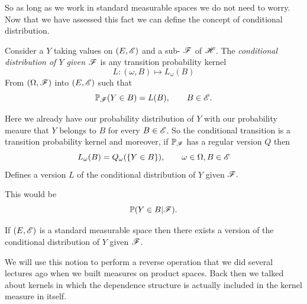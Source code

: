 \documentclass{report}
\begin{document}
So as long as we work in standard measurable spaces we do not need to worry. Now that we have assessed this fact we can define the concept of conditional distribution.
\begin{definition}
	Consider a \rv{} $Y$ taking values on $(E,\mathscr{E})$ and a sub-\sa{} $\mathscr{F}$ of $\mathscr{H}$. The \emph{conditional distribution of $Y$ given $\mathscr{F}$} is any transition probability kernel
	\begin{equation*}
		L:(\omega,B)\mapsto L_{\omega}(B)
	\end{equation*}
	From $(\Omega,\mathscr{F})$ into $(E,\mathscr{E})$ such that
	\begin{equation*}
		\mathbb{P}_{\mathscr{F}}(Y\in B)=L(B),\qquad B\in\mathscr{E}.
	\end{equation*}
 \end{definition}
 Here we already have our probability distribution of $Y$ with our probability meaure that $Y$ belongs to $B$ for every $B\in\mathscr{E}$. So the conditional transition is a transition probability kernel and moreover, if $\mathbb{P}_{\mathscr{F}}$ has a regular version $Q$ then 
 \begin{equation*}
 	L_\omega (B)=Q_\omega (\{Y\in B\}),\qquad\omega\in\Omega,B\in\mathscr{E}
 \end{equation*}
 Defines a version $L$ of the conditional distribution of $Y$ given $\mathscr{F}.$
 \begin{notation}
 	This would be 
 	\[\mathbb{P}(Y\in B|\mathscr{F}).\]
 \end{notation}
 \begin{theorem}
 	If $(E,\mathscr{E})$ is a standard measurable space then there exists a version of the conditional distribution of $Y$ given $\mathscr{F}$.
 \end{theorem}
 We will use this notion to perform a reverse operation that we did several lectures ago when we built measures on product spaces. Back then we talked about kernels in which the dependence structure is actually included in the kernel measure in itself.
\end{document}
